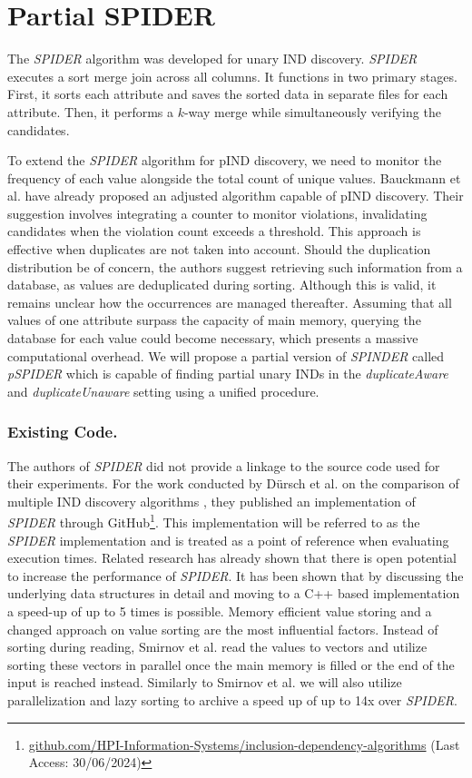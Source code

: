 \section{Partial SPIDER}

The \textit{SPIDER} algorithm \cite{bauckmann2006efficiently} was developed for unary IND discovery. \textit{SPIDER} executes a sort merge join across all columns. It functions in two primary stages. First, it sorts each attribute and saves the sorted data in separate files for each attribute. Then, it performs a $k$-way merge while simultaneously verifying the candidates.

To extend the \textit{SPIDER} algorithm for pIND discovery, we need to monitor the frequency of each value alongside the total count of unique values. Bauckmann et al. have already proposed an adjusted algorithm capable of pIND discovery. Their suggestion involves integrating a counter to monitor violations, invalidating candidates when the violation count exceeds a threshold. This approach is effective when duplicates are not taken into account. Should the duplication distribution be of concern, the authors suggest retrieving such information from a database, as values are deduplicated during sorting. Although this is valid, it remains unclear how the occurrences are managed thereafter. Assuming that all values of one attribute surpass the capacity of main memory, querying the database for each value could become necessary, which presents a massive computational overhead. We will propose a partial version of \textit{SPINDER} called \textit{pSPIDER} which is capable of finding partial unary INDs in the \textit{duplicateAware} and \textit{duplicateUnaware} setting using a unified procedure.

\subsubsection{\textbf{Existing Code.}}
The authors of \textit{SPIDER} did not provide a linkage to the source code used for their experiments. For the work conducted by Dürsch et al. on the comparison of multiple IND discovery algorithms \cite{dursch2019inclusion}, they published an implementation of \textit{SPIDER} through GitHub\footnote{\href{https://github.com/HPI-Information-Systems/inclusion-dependency-algorithms}{github.com/HPI-Information-Systems/inclusion-dependency-algorithms} (Last Access: 30/06/2024)}. This implementation will be referred to as the \textit{SPIDER} implementation and is treated as a point of reference when evaluating execution times. Related research has already shown that there is open potential to increase the performance of \textit{SPIDER}. It has been shown that by discussing the underlying data structures in detail and moving to a C++ based implementation \cite{smirnov2023fast} a speed-up of up to 5 times is possible. Memory efficient value storing and a changed approach on value sorting are the most influential factors. Instead of sorting during reading, Smirnov et al. read the values to vectors and utilize sorting these vectors in parallel once the main memory is filled or the end of the input is reached instead. Similarly to Smirnov et al. we will also utilize parallelization and lazy sorting to archive a speed up of up to 14x over \textit{SPIDER}.

